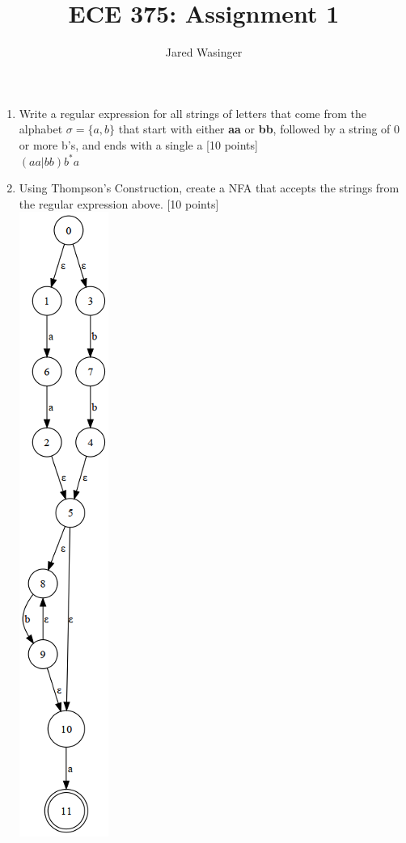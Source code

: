 \documentclass{article}
\begin{document}
  \title{ECE 375: Assignment 1}
  \author{Jared Wasinger}

  \maketitle
  \begin{enumerate}
  \item Write a regular expression for all strings of letters that come from the alphabet $\sigma=\{a,b\}$ that start with either \textbf{aa} or \textbf{bb}, followed by a string of 0 or more b's, and ends with a single a [10 points]\\

  $(aa|bb)b^*a$\\

  \item Using Thompson's Construction, create a NFA that accepts the strings from the regular expression above. [10 points]\\
  \includegraphics{nfa.png}\\


\end{enumerate}
\end{document}
